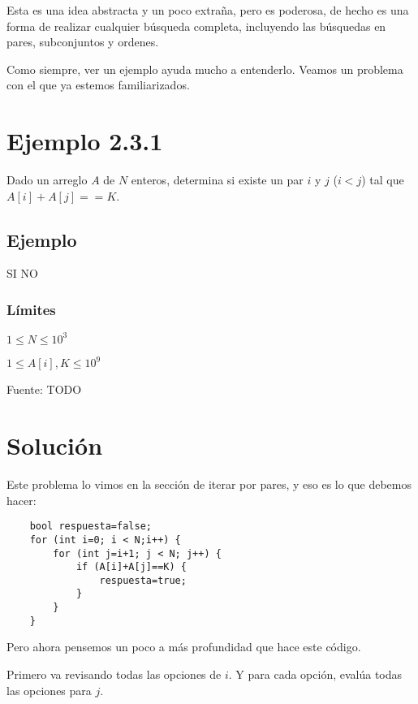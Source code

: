 Esta es una idea abstracta y un poco extraña, pero es poderosa, de hecho es una forma de realizar cualquier búsqueda completa, incluyendo las búsquedas en pares, subconjuntos y ordenes.

Como siempre, ver un ejemplo ayuda mucho a entenderlo. Veamos un problema con el que ya estemos familiarizados.
\section*{Ejemplo 2.3.1}
Dado un arreglo \(A\) de \(N\) enteros, determina si existe un par \(i\) y \(j\) (\(i<j\)) tal que \(A[i]+A[j]==K\).

\subsection*{Ejemplo}
\begin{casebox2}
	{SI}
	 {
		NO
	}

\end{casebox2}
\subsubsection*{Límites}
\begin{plimits}
	\item \(1\leq N \leq 10^3\)
	\item \(1\leq A[i], K \leq 10^9\)
\end{plimits}

Fuente: TODO

\section*{Solución}
Este problema lo vimos en la sección de iterar por pares, y eso es lo que debemos hacer:

\begin{lstlisting}
	bool respuesta=false;
	for (int i=0; i < N;i++) {
		for (int j=i+1; j < N; j++) {
			if (A[i]+A[j]==K) {
				respuesta=true;
			}
		}
	}
\end{lstlisting}

Pero ahora pensemos un poco a más profundidad que hace este código.

Primero va revisando todas las opciones de \(i\). Y para cada opción, evalúa todas las opciones para \(j\).

